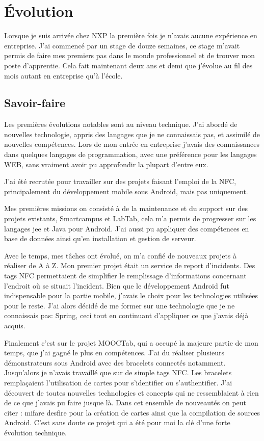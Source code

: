 \documentclass[french,12pt,a4paper,titlepage,openright,openbib]{report}
\begin{document}
\chapter{Évolution}
Lorsque je suis arrivée chez NXP la première fois je n'avais aucune expérience en entreprise. J'ai commencé par un stage de douze semaines, ce stage m'avait permis de faire mes premiers pas dans le monde professionnel et de trouver mon poste d'apprentie.
Cela fait maintenant deux ans et demi que j'évolue au fil des mois autant en entreprise qu'à l'école.
\section{Savoir-faire}
Les premières évolutions notables sont au niveau technique. J'ai abordé de nouvelles technologie, appris des langages que je ne connaissais pas, et assimilé de nouvelles compétences.
Lors de mon entrée en entreprise j'avais des connaissances dans quelques langages de programmation, avec une préférence pour les langages WEB, sans vraiment avoir pu approfondir la plupart d'entre eux.

J'ai été recrutée pour travailler sur des projets faisant l'emploi de la NFC, principalement du développement mobile sous Android, mais pas uniquement.

Mes premières missions on consisté à de la maintenance et du support sur des projets existants, Smartcampus et LabTab, cela m'a permis de progresser sur les langages \gls{jee} et Java pour Android. J'ai aussi pu appliquer des compétences en base de données ainsi qu'en installation et gestion de serveur.

Avec le temps, mes tâches ont évolué, on m'a confié de nouveaux projets à réaliser de A à Z.
Mon premier projet était un service de report d'incidents. Des tags NFC permettaient de simplifier le remplissage d'informations concernant l'endroit où se situait l'incident.
Bien que le développement Android fut indispensable pour la partie mobile, j'avais le choix pour les technologies utilisées pour le reste. J'ai alors décidé de me former sur une technologie que je ne connaissais pas: Spring, ceci tout en continuant d'appliquer ce que j'avais déjà acquis.

Finalement c'est sur le projet MOOCTab, qui a occupé la majeure partie de mon temps, que j'ai gagné le plus en compétences. J'ai du réaliser plusieurs démonstrateurs sous Android avec des bracelets connectés notamment. Jusqu'alors je n'avais travaillé que sur de simple tags NFC. Les bracelets remplaçaient l'utilisation de cartes pour s'identifier ou s'authentifier. J'ai découvert de toutes nouvelles technologies et concepts qui ne ressemblaient à rien de ce que j'avais pu faire jusque là.
Dans cet ensemble de nouveautés on peut citer : \gls{mifare} \gls{desfire} pour la création de cartes ainsi que la compilation de sources Android. C'est sans doute ce projet qui a été pour moi la clé d'une forte évolution technique.
\end{document}
